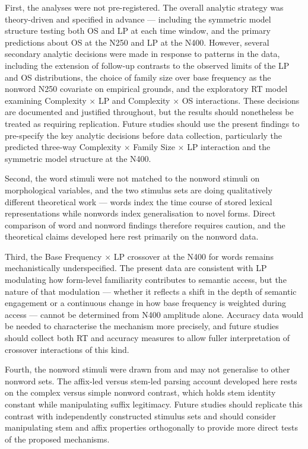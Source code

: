 \documentclass[utf8]{FrontiersinHarvard} %
\begin{document}
	First, the analyses were not pre-registered. The overall analytic strategy was theory-driven and specified in advance --- including the symmetric model structure testing both OS and LP at each time window, and the primary predictions about OS at the N250 and LP at the N400. However, several secondary analytic decisions were made in response to patterns in the data, including the extension of follow-up contrasts to the observed limits of the LP and OS distributions, the choice of family size over base frequency as the nonword N250 covariate on empirical grounds, and the exploratory RT model examining Complexity $\times$ LP and Complexity $\times$ OS interactions. These decisions are documented and justified throughout, but the results should nonetheless be treated as requiring replication. Future studies should use the present findings to pre-specify the key analytic decisions before data collection, particularly the predicted three-way Complexity $\times$ Family Size $\times$ LP interaction and the symmetric model structure at the N400.
	
	Second, the word stimuli were not matched to the nonword stimuli on morphological variables, and the two stimulus sets are doing qualitatively different theoretical work --- words index the time course of stored lexical representations while nonwords index generalisation to novel forms. Direct comparison of word and nonword findings therefore requires caution, and the theoretical claims developed here rest primarily on the nonword data.
	
	Third, the Base Frequency $\times$ LP crossover at the N400 for words remains mechanistically underspecified. The present data are consistent with LP modulating how form-level familiarity contributes to semantic access, but the nature of that modulation --- whether it reflects a shift in the depth of semantic engagement or a continuous change in how base frequency is weighted during access --- cannot be determined from N400 amplitude alone. Accuracy data would be needed to characterise the mechanism more precisely, and future studies should collect both RT and accuracy measures to allow fuller interpretation of crossover interactions of this kind.
	
	Fourth, the nonword stimuli were drawn from \citet{sawiIndividualDifferencesSensitivity2016} and may not generalise to other nonword sets. The affix-led versus stem-led parsing account developed here rests on the complex versus simple nonword contrast, which holds stem identity constant while manipulating suffix legitimacy. Future studies should replicate this contrast with independently constructed stimulus sets and should consider manipulating stem and affix properties orthogonally to provide more direct tests of the proposed mechanisms.
	
\end{document}
